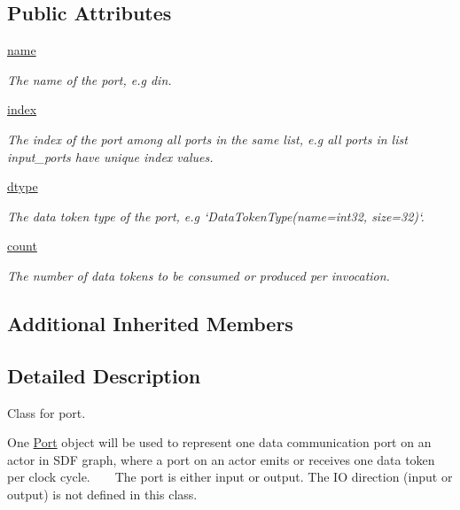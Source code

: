 \subsection*{Public Attributes}
\begin{DoxyCompactItemize}
\item 
\hyperlink{classsylva_1_1base_1_1sylva__base_1_1_port_a4e52c67462a68c12e544a8e95f065993}{name}
\begin{DoxyCompactList}\small\item\em The name of the port, e.\+g {\ttfamily din}. \end{DoxyCompactList}\item 
\hyperlink{classsylva_1_1base_1_1sylva__base_1_1_port_a36d850a63a97265c2a611d2387cf8491}{index}
\begin{DoxyCompactList}\small\item\em The index of the port among all ports in the same list, e.\+g all ports in list {\ttfamily input\+\_\+ports} have unique index values. \end{DoxyCompactList}\item 
\hyperlink{classsylva_1_1base_1_1sylva__base_1_1_port_a442668943cd208f89f54bb6613b4f514}{dtype}
\begin{DoxyCompactList}\small\item\em The data token type of the port, e.\+g `\+Data\+Token\+Type(name=\textquotesingle{}int32\textquotesingle{}, size=32)`. \end{DoxyCompactList}\item 
\hyperlink{classsylva_1_1base_1_1sylva__base_1_1_port_a3d01efab6495163880ccf499970f62fe}{count}
\begin{DoxyCompactList}\small\item\em The number of data tokens to be consumed or produced per invocation. \end{DoxyCompactList}\end{DoxyCompactItemize}
\subsection*{Additional Inherited Members}


\subsection{Detailed Description}
Class for port. 

One \hyperlink{classsylva_1_1base_1_1sylva__base_1_1_port}{Port} object will be used to represent one data communication port on an actor in S\+DF graph, where a port on an actor emits or receives one data token per clock cycle. ~\newline
~\newline
 The port is either input or output. The IO direction (input or output) is not defined in this class.


